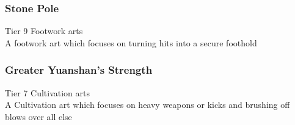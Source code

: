 \subsubsection{Stone Pole}
Tier 9 Footwork arts\\
A footwork art which focuses on turning hits into a secure foothold

\subsubsection{Greater Yuanshan's Strength}
Tier 7 Cultivation arts\\
A Cultivation art which focuses on heavy weapons or kicks and brushing off blows over all else

















